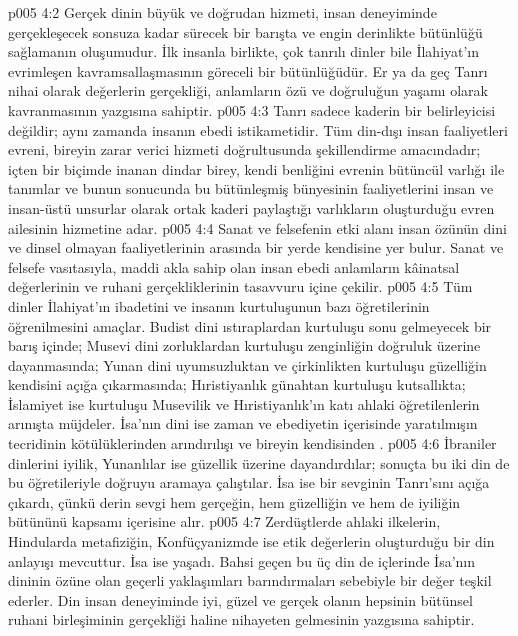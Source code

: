 \vs p005 4:2 Gerçek dinin büyük ve doğrudan hizmeti, insan deneyiminde gerçekleşecek sonsuza kadar sürecek bir barışta ve engin derinlikte bütünlüğü sağlamanın oluşumudur. İlk insanla birlikte, çok tanrılı dinler bile İlahiyat’ın evrimleşen kavramsallaşmasının göreceli bir bütünlüğüdür. Er ya da geç Tanrı nihai olarak değerlerin gerçekliği, anlamların özü ve doğruluğun yaşamı olarak kavranmasının yazgısına sahiptir.
\vs p005 4:3 Tanrı sadece kaderin bir belirleyicisi değildir; aynı zamanda insanın ebedi istikametidir. Tüm din\hyp{}dışı insan faaliyetleri evreni, bireyin zarar verici hizmeti doğrultusunda şekillendirme amacındadır; içten bir biçimde inanan dindar birey, kendi benliğini evrenin bütüncül varlığı ile tanımlar ve bunun sonucunda bu bütünleşmiş bünyesinin faaliyetlerini insan ve insan\hyp{}üstü unsurlar olarak ortak kaderi paylaştığı varlıkların oluşturduğu evren ailesinin hizmetine adar.
\vs p005 4:4 Sanat ve felsefenin etki alanı insan özünün dini ve dinsel olmayan faaliyetlerinin arasında bir yerde kendisine yer bulur. Sanat ve felsefe vasıtasıyla, maddi akla sahip olan insan ebedi anlamların kâinatsal değerlerinin ve ruhani gerçekliklerinin tasavvuru içine çekilir.
\vs p005 4:5 Tüm dinler İlahiyat’ın ibadetini ve insanın kurtuluşunun bazı öğretilerinin öğrenilmesini amaçlar. Budist dini ıstıraplardan kurtuluşu sonu gelmeyecek bir barış içinde; Musevi dini zorluklardan kurtuluşu zenginliğin doğruluk üzerine dayanmasında; Yunan dini uyumsuzluktan ve çirkinlikten kurtuluşu güzelliğin kendisini açığa çıkarmasında; Hıristiyanlık günahtan kurtuluşu kutsallıkta; İslamiyet ise kurtuluşu Musevilik ve Hıristiyanlık’ın katı ahlaki öğretilenlerin arınışta müjdeler. İsa’nın dini ise zaman ve ebediyetin içerisinde yaratılmışın tecridinin kötülüklerinden arındırılışı ve bireyin kendisinden .
\vs p005 4:6 İbraniler dinlerini iyilik, Yunanlılar ise güzellik üzerine dayandırdılar; sonuçta bu iki din de bu öğretileriyle doğruyu aramaya çalıştılar. İsa ise bir sevginin Tanrı’sını açığa çıkardı, çünkü derin sevgi hem gerçeğin, hem güzelliğin ve hem de iyiliğin bütününü kapsamı içerisine alır.
\vs p005 4:7 Zerdüştlerde ahlaki ilkelerin, Hindularda metafiziğin, Konfüçyanizmde ise etik değerlerin oluşturduğu bir din anlayışı mevcuttur. İsa ise  yaşadı. Bahsi geçen bu üç din de içlerinde İsa’nın dininin özüne olan geçerli yaklaşımları barındırmaları sebebiyle bir değer teşkil ederler. Din insan deneyiminde iyi, güzel ve gerçek olanın hepsinin bütünsel ruhani birleşiminin gerçekliği haline nihayeten gelmesinin yazgısına sahiptir.
